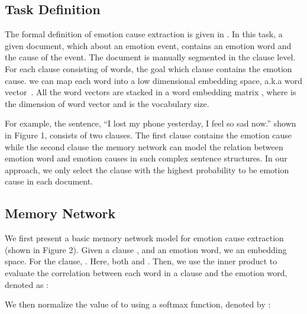 \documentclass[11pt,letterpaper]{article}
\begin{document}
\begin{CJK*}{UTF8}{gbsn}
\subsection{Task Definition}
\label{sec:definition}

The formal definition of emotion cause extraction is given in \cite{gui2016event}. In this task, a given document, which 
about an emotion event, contains an emotion word  and the cause of the event. The document is manually segmented in the clause level. For each clause  consisting of  words, the goal 
which clause contains the emotion cause. 
we can map each word into a low dimensional embedding space, a.k.a word vector~\cite{mikolov2013distributed}. All the word vectors are stacked in a word embedding matrix , where  is the dimension of word vector and  is the vocabulary size.

For example, the sentence, ``I lost my phone yesterday, I feel so sad now.'' shown in Figure 1, consists of two clauses. The first clause contains the emotion cause while the second clause 
the memory network can  model the relation between 
emotion word and  emotion causes in such complex sentence structures. In our approach, we only select the clause with the highest probability to be  emotion cause in each document.

\subsection{Memory Network}
\label{sec:basicMemoryNetwork}

We first present a basic memory network model for emotion cause extraction (shown in Figure 2). Given a clause , and an emotion word, we 
an embedding space. For the clause, 
.
Here, both  and   . Then, we use the inner product to evaluate the correlation between each word \added[id=lq]{ }in a clause and the emotion word, denoted as :


We then normalize the value of  to  using a softmax function, denoted by  :


\end{CJK*}
\end{document}
